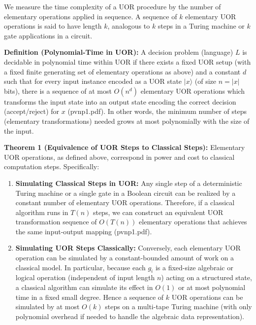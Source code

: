 \documentclass{article}
\begin{document}
We measure the time complexity of a UOR procedure by the number of elementary operations applied in sequence. A sequence of $k$ elementary UOR operations is said to have length $k$, analogous to $k$ steps in a Turing machine or $k$ gate applications in a circuit.

\medskip
\textbf{Definition (Polynomial-Time in UOR):} A decision problem (language) $L$ is decidable in polynomial time within UOR if there exists a fixed UOR setup (with a fixed finite generating set of elementary operations as above) and a constant $d$ such that for every input instance encoded as a UOR state $|x\rangle$ (of size $n = |x|$ bits), there is a sequence of at most $O(n^d)$ elementary UOR operations which transforms the input state into an output state encoding the correct decision (accept/reject) for $x$ (pvnp1.pdf). In other words, the minimum number of steps (elementary transformations) needed grows at most polynomially with the size of the input.

\medskip
\textbf{Theorem 1 (Equivalence of UOR Steps to Classical Steps):} Elementary UOR operations, as defined above, correspond in power and cost to classical computation steps. Specifically:
\begin{enumerate}
    \item \textbf{Simulating Classical Steps in UOR:} Any single step of a deterministic Turing machine or a single gate in a Boolean circuit can be realized by a constant number of elementary UOR operations. Therefore, if a classical algorithm runs in $T(n)$ steps, we can construct an equivalent UOR transformation sequence of $O(T(n))$ elementary operations that achieves the same input-output mapping (pvnp1.pdf).
    \item \textbf{Simulating UOR Steps Classically:} Conversely, each elementary UOR operation can be simulated by a constant-bounded amount of work on a classical model. In particular, because each $g_i$ is a fixed-size algebraic or logical operation (independent of input length $n$) acting on a structured state, a classical algorithm can simulate its effect in $O(1)$ or at most polynomial time in a fixed small degree. Hence a sequence of $k$ UOR operations can be simulated by at most $O(k)$ steps on a multi-tape Turing machine (with only polynomial overhead if needed to handle the algebraic data representation).
\end{enumerate}
\end{document}
